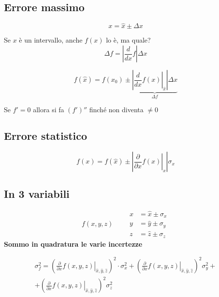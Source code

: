 \documentclass[11pt,a4paper,oneside]{book}
\newcommand{\chiave}[1]{\textbf{#1}}
\begin{document}
\subsection*{Errore massimo}
\[
  x = \hat{x} \pm \Delta x
\]
\begin{minipage}[c]{0.45\linewidth}
\centering
{}
\end{minipage}\hfill
\begin{minipage}[c]{0.5\linewidth}
Se $x$ è un intervallo, anche $f(x)$ lo è, ma quale?
\[
  \Delta f = \left| \frac{d}{dx} f \right| \Delta x
\]
\end{minipage}
\begin{formulabox}
\[
  f(\hat{x}) = f(x_0) \pm \underbrace{\left| \left. \frac{d}{dx} f(x) \right|_{\hat{x}} \right| \Delta x}_{\Delta f}
\]
\end{formulabox}
Se $f' = 0$ allora si fa $(f')''$ finché non diventa $\neq 0$

\subsection*{Errore statistico}
\begin{formulabox}
\[
  f(x) = f(\hat{x}) \pm \left| \left. \frac{\partial}{\partial x} f(x) \right|_{\hat{x}} \right| \sigma_x
\]
\end{formulabox}

\subsection*{In 3 variabili}
\[
  f(x, y, z) \qquad
  \begin{aligned}
    x &= \hat{x} \pm \sigma_x \\
    y &= \hat{y} \pm \sigma_y \\
    z &= \hat{z} \pm \sigma_z
  \end{aligned}
\]
\chiave{Sommo in quadratura le varie incertezze}
\begin{formulabox}
\begin{multline*}
  \sigma_f^2 = \left( \left. \frac{\partial}{\partial x} f(x, y, z) \right|_{\hat{x}, \hat{y}, \hat{z}} \right)^{2} \cdot \sigma_x^2
  + \left( \left. \frac{\partial}{\partial x} f(x, y, z) \right|_{\hat{x}, \hat{y}, \hat{z}} \right)^{2} \sigma_y^2 + {} \\
  + \left( \left. \frac{\partial}{\partial x} f(x, y, z) \right|_{\hat{x}, \hat{y}, \hat{z}} \right)^{2} \sigma_z^2
\end{multline*}
\end{formulabox}
\end{document}
